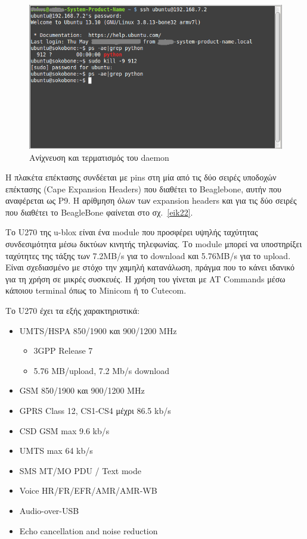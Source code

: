 \documentclass[12pt, a4paper, oneside]{report}
\begin{document}
\begin{figure}[!b]
\centering
\includegraphics[scale=0.8]{eikona_28}
\caption{Ανίχνευση και τερματισμός του daemon}\label{eik28}
\end{figure}

Η πλακέτα επέκτασης συνδέεται με pins στη μία από τις δύο σειρές υποδοχών επέκτασης (Cape Expansion Headers) που διαθέτει το Beaglebone, αυτήν που αναφέρεται ως P9. Η αρίθμηση όλων των expansion headers και για τις δύο σειρές που διαθέτει το BeagleBone φαίνεται στο σχ.~\ref{eik22}.

Το U270 της u-blox είναι ένα module που προσφέρει υψηλής ταχύτητας συνδεσιμότητα μέσω δικτύων κινητής τηλεφωνίας. Το module μπορεί να υποστηρίξει ταχύτητες της τάξης των 7.2MB/s για το download και 5.76MB/s για το upload. Είναι σχεδιασμένο με στόχο την χαμηλή κατανάλωση, πράγμα που το κάνει ιδανικό για τη χρήση σε μικρές συσκευές. Η χρήση του γίνεται με AT Commands μέσω κάποιου terminal όπως το Minicom ή το Cutecom.

Το U270 έχει τα εξής χαρακτηριστικά:
\begin{itemize}
\item UMTS\slash HSPA 850\slash 1900 και 900\slash 1200 MHz
	\begin{itemize}
	\item 3GPP Release 7
	\item 5.76 MB\slash upload, 7.2 Mb\slash s download
	\end{itemize}
\item GSM 850\slash 1900 και 900\slash 1200 MHz
\item GPRS Class 12, CS1-CS4 μέχρι 86.5 kb\slash s
\item CSD GSM max 9.6 kb\slash s
\item UMTS max 64 kb\slash s
\item SMS MT\slash MO PDU \slash{} Text mode
\item Voice HR\slash FR\slash EFR\slash AMR\slash AMR-WB
\item Audio-over-USB
\item Echo cancellation and noise reduction
\end{itemize}
\end{document}
